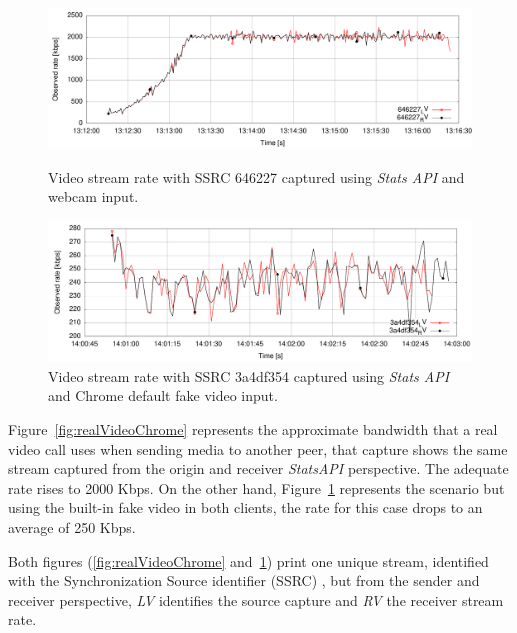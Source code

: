  \begin{figure}[h]
  \centering
   \includegraphics[width=1\textwidth]{./figures/realVideoChrome.pdf}
     \caption[Video stream rate with SSRC 646227 captured using {\it Stats API} and webcam input]{Video stream rate with SSRC 646227 captured using {\it Stats API} and webcam input.}
	\label{fig:realVideoChrome}
  \centering
	\includegraphics[width=1\textwidth]{./figures/automatedVideoChrome.pdf}
	\caption[Video stream rate with SSRC 3a4df354 captured using {\it Stats API} and Chrome default fake content]{Video stream rate with SSRC 3a4df354 captured using {\it Stats API} and Chrome default fake video input.}
	\label{fig:automatedVideoChrome}
\end{figure}

Figure~\ref{fig:realVideoChrome} represents the approximate bandwidth that a real video call uses when sending media to another peer, that capture shows the same stream captured from the origin and receiver {\it StatsAPI} perspective. The adequate rate rises to 2000 Kbps. On the other hand, Figure~\ref{fig:automatedVideoChrome} represents the scenario but using the built-in fake video in both clients, the rate for this case drops to an average of 250 Kbps. 

Both figures (\ref{fig:realVideoChrome} and~\ref{fig:automatedVideoChrome}) print one unique stream, identified with the Synchronization Source identifier (SSRC) , but from the sender and receiver perspective, {\it LV} identifies the source capture and {\it RV} the receiver stream rate. 

